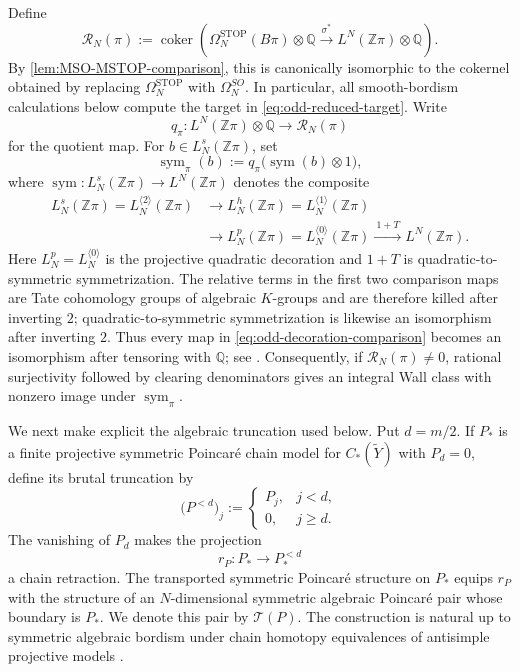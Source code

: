 \documentclass[10pt,reqno]{amsart}
\numberwithin{equation}{section}
\theoremstyle{definition}
\theoremstyle{remark}
\newcommand{\Z}{\mathbb Z}
\newcommand{\Q}{\mathbb Q}
\newcommand{\STOP}{\mathrm{STOP}}
\newcommand{\cR}{\mathcal R}
\begin{document}
Define
\begin{equation}\label{eq:odd-reduced-target}
\cR_N(\pi)
:=
\operatorname{coker}\!\left(
\Omega_N^{\STOP}(B\pi)\otimes\Q
\xrightarrow{\ \sigma^*\ }
L^N(\Z\pi)\otimes\Q
\right).
\end{equation}
By \cref{lem:MSO-MSTOP-comparison}, this is canonically isomorphic to
the cokernel obtained by replacing \(\Omega_N^{\STOP}\) with
\(\Omega_N^{SO}\).  In particular, all smooth-bordism calculations
below compute the target in \eqref{eq:odd-reduced-target}.
Write
\[
q_\pi\colon
L^N(\Z\pi)\otimes\Q
\longrightarrow
\cR_N(\pi)
\]
for the quotient map.  For \(b\in L_N^s(\Z\pi)\), set
\begin{equation}\label{eq:odd-reduced-symmetrization}
\operatorname{sym}_\pi(b)
:=
q_\pi\bigl(\operatorname{sym}(b)\otimes1\bigr),
\end{equation}
where
\(
\operatorname{sym}\colon L_N^s(\Z\pi)\to L^N(\Z\pi)
\)
denotes the composite
\begin{equation}\label{eq:odd-decoration-comparison}
\begin{aligned}
L_N^s(\Z\pi)
=L_N^{\langle2\rangle}(\Z\pi)
&\longrightarrow
L_N^h(\Z\pi)
=L_N^{\langle1\rangle}(\Z\pi)\\
&\longrightarrow
L_N^p(\Z\pi)
=L_N^{\langle0\rangle}(\Z\pi)
\xrightarrow{\ 1+T\ }
L^N(\Z\pi).
\end{aligned}
\end{equation}
Here \(L_N^p=L_N^{\langle0\rangle}\) is the projective quadratic
decoration and \(1+T\) is quadratic-to-symmetric symmetrization.
The relative terms in the first two comparison maps are
Tate cohomology groups of algebraic \(K\)-groups and are therefore
killed after inverting \(2\); quadratic-to-symmetric
symmetrization is likewise an isomorphism after inverting \(2\).
Thus every map in \eqref{eq:odd-decoration-comparison} becomes an
isomorphism after tensoring with \(\Q\); see
\cite{RanickiALT,RanickiAG}.  Consequently, if
\(\cR_N(\pi)\neq0\), rational surjectivity followed by clearing
denominators gives an integral Wall class with nonzero image under
\(\operatorname{sym}_\pi\).

We next make explicit the algebraic truncation used below.  Put
\(d=m/2\).  If \(P_*\) is a finite projective symmetric Poincar\'e
chain model for \(C_*(\widetilde Y)\) with \(P_d=0\), define its
brutal truncation by
\begin{equation}\label{eq:odd-brutal-truncation}
\bigl(P^{<d}\bigr)_j
:=
\begin{cases}
P_j,&j<d,\\
0,&j\geq d.
\end{cases}
\end{equation}
The vanishing of \(P_d\) makes the projection
\[
r_P:P_*\longrightarrow P^{<d}_*
\]
a chain retraction.  The transported symmetric Poincar\'e structure
on \(P_*\) equips \(r_P\) with the structure of an
\(N\)-dimensional symmetric algebraic Poincar\'e pair whose boundary
is \(P_*\).  We denote this pair by \(\mathcal T(P)\).  The
construction is natural up to symmetric algebraic bordism under chain
homotopy equivalences of antisimple projective models
\cite[Proposition~2.26]{DFW}.
\end{document}
